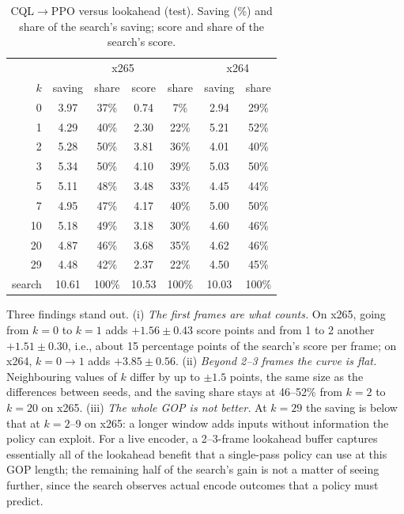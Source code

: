 \documentclass[conference]{IEEEtran}
\newcommand{\cqlppo}{CQL$\to$PPO}
\begin{document}
\begin{table}[t]
\centering\footnotesize
\caption{\cqlppo{} versus lookahead (test). Saving (\%) and share of the search's saving; score and share of the search's score.}
\label{tab:share}
\setlength{\tabcolsep}{3.5pt}
\begin{tabular}{@{}r cc cc | cc@{}}
\toprule
 & \multicolumn{4}{c|}{x265} & \multicolumn{2}{c}{x264}\\
$k$ & saving & share & score & share & saving & share\\
\midrule
0 & 3.97 & 37\% & 0.74 & 7\% & 2.94 & 29\%\\
1 & 4.29 & 40\% & 2.30 & 22\% & 5.21 & 52\%\\
2 & 5.28 & 50\% & 3.81 & 36\% & 4.01 & 40\%\\
3 & 5.34 & 50\% & 4.10 & 39\% & 5.03 & 50\%\\
5 & 5.11 & 48\% & 3.48 & 33\% & 4.45 & 44\%\\
7 & 4.95 & 47\% & 4.17 & 40\% & 5.00 & 50\%\\
10 & 5.18 & 49\% & 3.18 & 30\% & 4.60 & 46\%\\
20 & 4.87 & 46\% & 3.68 & 35\% & 4.62 & 46\%\\
29 & 4.48 & 42\% & 2.37 & 22\% & 4.50 & 45\%\\
\midrule
search & 10.61 & 100\% & 10.53 & 100\% & 10.03 & 100\%\\
\bottomrule
\end{tabular}
\end{table}

Three findings stand out. (i) \emph{The first frames are what counts.} On x265, going from $k{=}0$ to $k{=}1$ adds $+1.56\pm0.43$ score points and from 1 to 2 another $+1.51\pm0.30$, i.e., about 15 percentage points of the search's score per frame; on x264, $k{=}0\to1$ adds $+3.85\pm0.56$. (ii) \emph{Beyond 2--3 frames the curve is flat.} Neighbouring values of $k$ differ by up to $\pm1.5$ points, the same size as the differences between seeds, and the saving share stays at 46--52\% from $k{=}2$ to $k{=}20$ on x265. (iii) \emph{The whole GOP is not better.} At $k{=}29$ the saving is below that at $k{=}2$--9 on x265: a longer window adds inputs without information the policy can exploit. For a live encoder, a 2--3-frame lookahead buffer captures essentially all of the lookahead benefit that a single-pass policy can use at this GOP length; the remaining half of the search's gain is not a matter of seeing further, since the search observes actual encode outcomes that a policy must predict.
\end{document}
